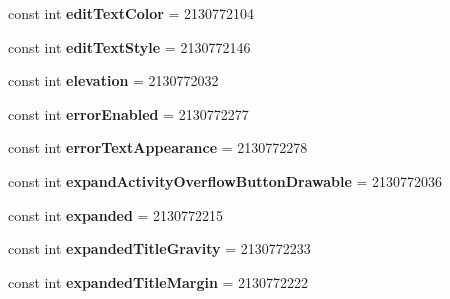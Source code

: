 \begin{DoxyCompactItemize}
const int {\bfseries edit\+Text\+Color} = 2130772104
\item 
\mbox{\label{class_pinned_app_1_1_droid_1_1_resource_1_1_attribute_ad442e8e790b587c6fb2a3255df82e7ad}} 
const int {\bfseries edit\+Text\+Style} = 2130772146
\item 
\mbox{\label{class_pinned_app_1_1_droid_1_1_resource_1_1_attribute_ac850918db12556f19266db789b6cb060}} 
const int {\bfseries elevation} = 2130772032
\item 
\mbox{\label{class_pinned_app_1_1_droid_1_1_resource_1_1_attribute_a6a98295fbd73f0351231395eded59a28}} 
const int {\bfseries error\+Enabled} = 2130772277
\item 
\mbox{\label{class_pinned_app_1_1_droid_1_1_resource_1_1_attribute_a06e06db1a27e56b4f76696409c755937}} 
const int {\bfseries error\+Text\+Appearance} = 2130772278
\item 
\mbox{\label{class_pinned_app_1_1_droid_1_1_resource_1_1_attribute_a4d629123e91cbb81385c3b9077963e2a}} 
const int {\bfseries expand\+Activity\+Overflow\+Button\+Drawable} = 2130772036
\item 
\mbox{\label{class_pinned_app_1_1_droid_1_1_resource_1_1_attribute_a7644442309bf91b086689795b1d8e274}} 
const int {\bfseries expanded} = 2130772215
\item 
\mbox{\label{class_pinned_app_1_1_droid_1_1_resource_1_1_attribute_aefbbe21735d487e783d8386c306522c9}} 
const int {\bfseries expanded\+Title\+Gravity} = 2130772233
\item 
\mbox{\label{class_pinned_app_1_1_droid_1_1_resource_1_1_attribute_a1f1109ace7e43b796f984475352dfd73}} 
const int {\bfseries expanded\+Title\+Margin} = 2130772222
\item 
\mbox{\label{class_pinned_app_1_1_droid_1_1_resource_1_1_attribute_abcd5199d2aa57324297585aed145ec80}} 

\end{DoxyCompactItemize}

